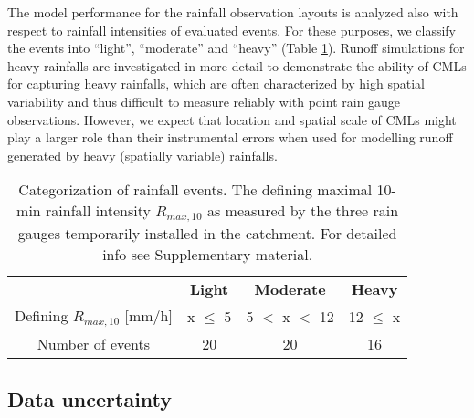 \documentclass{ctuthesis}\usepackage[]{graphicx}\usepackage[]{color}
\begin{document}
The model performance for the rainfall observation layouts is analyzed also with respect to rainfall intensities of evaluated events. For these purposes, we classify the events into “light”, “moderate” and “heavy” (Table \ref{2tab2}). Runoff simulations for heavy rainfalls are investigated in more detail to demonstrate the ability of CMLs for capturing heavy rainfalls, which are often characterized by high spatial variability and thus difficult to measure reliably with point rain gauge observations. However, we expect that location and spatial scale of CMLs might play a larger role than their instrumental errors when used for modelling runoff generated by heavy (spatially variable) rainfalls.

\begin{table}[h]
\begin{ctucolortab}
\centering
\begin{tabular}{ c | c  c  c  }
	    &       \textbf{Light}   &  \bfseries Moderate  &  \bfseries  Heavy    \\ \Midrule
        Defining $R_{max,10}$ [mm/h]  &  x $\leq$ 5  & 5 $<$ x $<$ 12 &  12 $\leq$ x     \\
            Number of events  &  20  & 20 &  16
\end{tabular}
\caption{Categorization of rainfall events. The defining maximal 10-min rainfall intensity $R_{max,10}$ as measured by the three rain gauges temporarily installed in the catchment. For detailed info see Supplementary material.}
\label{2tab2}
\end{ctucolortab}
\end{table}



\subsection{Data uncertainty} \label{Quncer}
\end{document}
